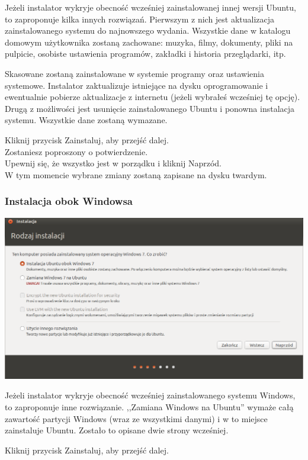 Jeżeli instalator wykryje obecność wcześniej zainstalowanej innej wersji Ubuntu, to zaproponuje kilka innych rozwiązań.
Pierwszym z nich jest aktualizacja zainstalowanego systemu do najnowszego wydania. Wszystkie dane w katalogu domowym użytkownika zostaną zachowane: muzyka, filmy, dokumenty, pliki na pulpicie, osobiste ustawienia programów, zakładki i historia przeglądarki, itp.

Skasowane zostaną zainstalowane w systemie programy oraz ustawienia systemowe. Instalator zaktualizuje istniejące na dysku oprogramowanie i ewentualnie pobierze aktualizacje z internetu (jeżeli wybrałeś wcześniej tę opcję).
Drugą z możliwości jest usunięcie zainstalowanego Ubuntu i ponowna instalacja systemu. Wszystkie dane zostaną wymazane.
\begin{flushright}
Kliknij przycisk \textcolor{ubuntu_orange}{Zainstaluj}, aby przejść dalej.\\
Zostaniesz poproszony o potwierdzenie.\\
Upewnij się, że wszystko jest w porządku i kliknij \textcolor{ubuntu_orange}{Naprzód}.\\
W tym momencie wybrane zmiany zostaną zapisane na dysku twardym.
\end{flushright}
\clearpage
\subsubsection{Instalacja obok Windowsa}
\begin{center}
	\includegraphics[width=\linewidth]{images/instalator_partycjonowanie_obok_wondows7.png}
\end{center}

Jeżeli instalator wykryje obecność wcześniej zainstalowanego systemu Windows, to zaproponuje inne rozwiązanie. ,,Zamiana Windows na Ubuntu'' wymaże całą zawartość partycji Windows (wraz ze wszystkimi danymi) i w to miejsce zainstaluje Ubuntu. Zostało to opisane dwie strony wcześniej.
\begin{flushright}
Kliknij przycisk \textcolor{ubuntu_orange}{Zainstaluj}, aby przejść dalej.
\end{flushright}


